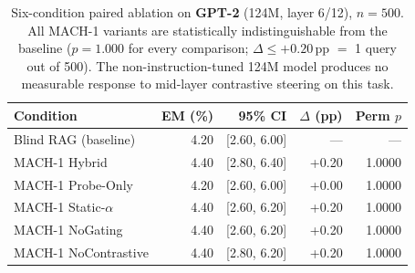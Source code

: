 \begin{table}[htbp]
\caption{Six-condition paired ablation on \textbf{GPT-2} (124M, layer 6/12), $n\!=\!500$. All MACH-1 variants are statistically indistinguishable from the baseline ($p\!=\!1.000$ for every comparison; $\Delta\leq+0.20$\,pp $=$ 1 query out of 500). The non-instruction-tuned 124M model produces no measurable response to mid-layer contrastive steering on this task.}
\label{tab:gpt2-ablation}
\centering\renewcommand{\arraystretch}{1.15}
\begin{tabular}{l r r r r}
\toprule
Condition & EM (\%) & 95\% CI & $\Delta$ (pp) & Perm $p$ \\
\midrule
Blind RAG (baseline) & 4.20 & [2.60, 6.00] & --- & --- \\
MACH-1 Hybrid & 4.40 & [2.80, 6.40] & +0.20 & 1.0000 \\
MACH-1 Probe-Only & 4.20 & [2.60, 6.00] & +0.00 & 1.0000 \\
MACH-1 Static-$\alpha$ & 4.40 & [2.60, 6.20] & +0.20 & 1.0000 \\
MACH-1 NoGating & 4.40 & [2.60, 6.20] & +0.20 & 1.0000 \\
MACH-1 NoContrastive & 4.40 & [2.80, 6.20] & +0.20 & 1.0000 \\
\bottomrule\end{tabular}\end{table}
